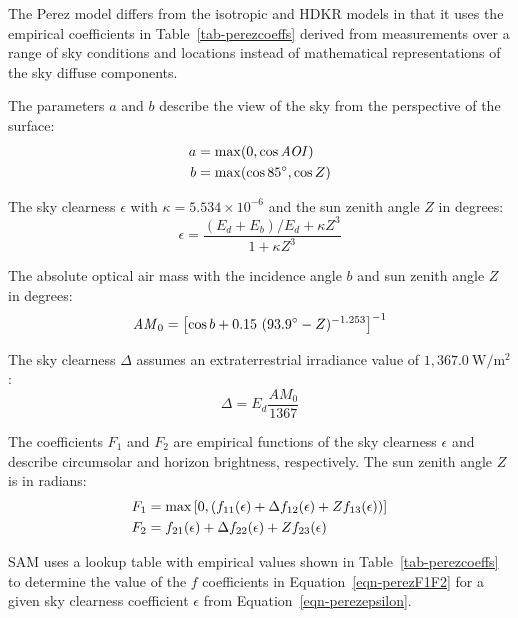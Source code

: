 \documentclass[12pt,letterpaper]{article}
\newcommand\AOI{\ensuremath{\mathit{AOI}}}
\begin{document}
The Perez model differs from the isotropic and HDKR models in that it uses the empirical  coefficients in Table~\ref{tab-perezcoeffs} derived from measurements over a range of sky conditions and locations instead of mathematical representations of the sky diffuse components.

The parameters $a$ and $b$ describe the view of the sky from the perspective of the surface:
\begin{align}
a &= \max( 0, \cos \AOI ) \notag\\
b & =\max( \cos85\degree, \cos Z) 
\end{align}

The sky clearness $\epsilon$ with $\kappa=5.534\times10^{-6}$ and the sun zenith angle
 $Z$ in degrees:
\begin{equation}\label{eqn-perezepsilon}
\epsilon =\frac{(E_d + E_b ) / E_d + \kappa Z^{3} }{1 +  \kappa Z^{3}}
\end{equation}

The absolute optical air mass with the incidence angle $b$ and sun zenith angle $Z$ in degrees:
\begin{equation}\label{eqn-perezam}
\mathit{AM}_0 = \left[ \cos b + 0.15~( 93.9\degree - Z )^{-1.253} \right]^{-1}
\end{equation}

The sky clearness $\Delta$ assumes an extraterrestrial irradiance value of $1,367.0~\mathrm{W/m^2}$:
\begin{equation}
\Delta = E_d \frac{\mathit{AM}_0}{1367}
\end{equation}

The coefficients $F_1$ and $F_2$ are empirical functions of the sky clearness $\epsilon$ and describe circumsolar and horizon brightness, respectively. The sun zenith angle $Z$ is in radians:
\begin{align}\label{eqn-perezF1F2}
F_1 & = \max \left[ 0,  \left( f_{\mathrm{11}}(\epsilon) + \Delta f_{\mathrm{12}}(\epsilon) + Z f_{\mathrm{13}}(\epsilon) \right) \right ] \notag\\
F_2 &= f_{\mathrm{21}}(\epsilon) + \Delta f_{\mathrm{22}}(\epsilon) + Z f_{\mathrm{23}}(\epsilon)
\end{align}

SAM uses a lookup table with empirical values shown in Table~\ref{tab-perezcoeffs} to determine the value of the $f$ coefficients in Equation~\ref{eqn-perezF1F2} for a given sky clearness coefficient $\epsilon$ from Equation~\ref{eqn-perezepsilon}.
\end{document}
